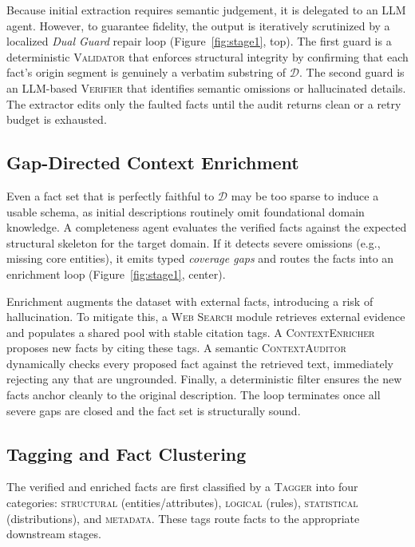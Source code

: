 Because initial extraction requires semantic judgement, it is delegated to an LLM agent. However, to guarantee fidelity, the output is iteratively scrutinized by a localized \emph{Dual Guard} repair loop (Figure~\ref{fig:stage1}, top). The first guard is a deterministic \textsc{Validator} that enforces structural integrity by confirming that each fact's origin segment is genuinely a verbatim substring of $\mathcal{D}$. The second guard is an LLM-based \textsc{Verifier} that identifies semantic omissions or hallucinated details. The extractor edits only the faulted facts until the audit returns clean or a retry budget is exhausted.

\subsection{Gap-Directed Context Enrichment}
\label{subsec:enrichment}

Even a fact set that is perfectly faithful to $\mathcal{D}$ may be too sparse to induce a usable schema, as initial descriptions routinely omit foundational domain knowledge. A completeness agent evaluates the verified facts against the expected structural skeleton for the target domain. If it detects severe omissions (e.g., missing core entities), it emits typed \emph{coverage gaps} and routes the facts into an enrichment loop (Figure~\ref{fig:stage1}, center).

Enrichment augments the dataset with external facts, introducing a risk of hallucination. To mitigate this, a \textsc{Web Search} module retrieves external evidence and populates a shared pool with stable citation tags. A \textsc{ContextEnricher} proposes new facts by citing these tags. A semantic \textsc{ContextAuditor} dynamically checks every proposed fact against the retrieved text, immediately rejecting any that are ungrounded. Finally, a deterministic filter ensures the new facts anchor cleanly to the original description. The loop terminates once all severe gaps are closed and the fact set is structurally sound.

\subsection{Tagging and Fact Clustering}
\label{subsec:cluster}

The verified and enriched facts are first classified by a \textsc{Tagger} into four categories: \textsc{structural} (entities/attributes), \textsc{logical} (rules), \textsc{statistical} (distributions), and \textsc{metadata}. These tags route facts to the appropriate downstream stages.

